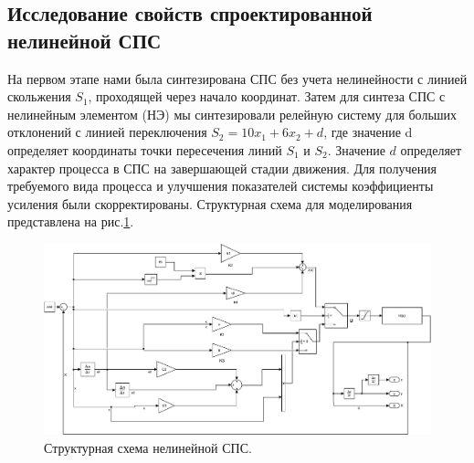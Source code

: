 \clearpage
\subsection{Исследование свойств спроектированной нелинейной СПС}
На первом этапе нами была синтезирована СПС без учета нелинейности с линией скольжения  $S_1$, проходящей через начало координат. Затем для синтеза СПС с нелинейным элементом (НЭ) мы синтезировали релейную систему для больших отклонений с линией переключения $S_2=10x_1+6x_2+d$, где значение d определяет координаты точки пересечения линий $S_1$ и $S_2$. Значение $d$ определяет характер процесса в СПС на завершающей стадии движения. Для получения требуемого вида процесса и улучшения показателей системы коэффициенты усиления были скорректированы. Структурная схема для моделирования представлена на  рис.\ref{fig:sim_final_VSS}. 
\begin{figure}[!h]\centering
\includegraphics[width=1.0\linewidth]{images/sim_final_VSS}
\caption{Структурная схема нелинейной СПС.}\label{fig:sim_final_VSS}
\end{figure}

